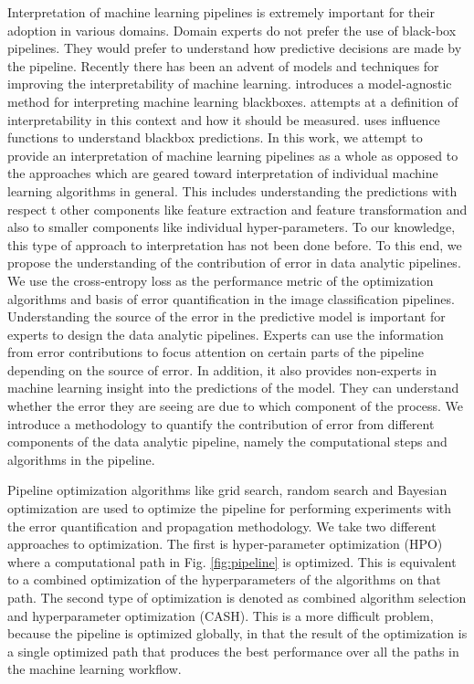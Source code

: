 Interpretation of machine learning pipelines is extremely important for their adoption in various domains. Domain experts do not prefer the use of black-box pipelines. They would prefer to understand how predictive decisions are made by the pipeline. Recently there has been an advent of models and techniques for improving the interpretability of machine learning. \cite{ribeiro2016model} introduces a model-agnostic method for interpreting machine learning blackboxes. \cite{doshi2017towards} attempts at a definition of interpretability in this context and how it should be measured. \cite{koh2017understanding} uses influence functions to understand blackbox predictions. In this work, we attempt to provide an interpretation of machine learning pipelines as a whole as opposed to the approaches which are geared toward interpretation of individual machine learning algorithms in general. This includes understanding the predictions with respect t other components like feature extraction and feature transformation and also to smaller components like individual hyper-parameters. To our knowledge, this type of approach to interpretation has not been done before.
To this end, we propose the understanding of the contribution of error in data analytic pipelines. We use the cross-entropy loss as the performance metric of the optimization algorithms and basis of error quantification in the image classification pipelines. Understanding the source of the error in the predictive model is important for experts to design the data analytic pipelines. Experts can use the information from error contributions to focus attention on certain parts of the pipeline depending on the source of error. In addition, it also provides non-experts in machine learning insight into the predictions of the model. They can understand whether the error they are seeing are due to which component of the process. We introduce a methodology to quantify the contribution of error from different components of the data analytic pipeline, namely the computational steps and algorithms in the pipeline. 

Pipeline optimization algorithms like grid search, random search \cite{bergstra2012random} and Bayesian optimization \cite{snoek2012practical} are used to optimize the pipeline for performing experiments with the error quantification and propagation methodology. We take two different approaches to optimization. The first is hyper-parameter optimization (HPO) where a computational path in Fig. \ref{fig:pipeline} is optimized. This is equivalent to a combined optimization of the hyperparameters of the algorithms on that path. The second type of optimization is denoted as combined algorithm selection and hyperparameter optimization (CASH). This is a more difficult problem, because the pipeline is optimized globally, in that the result of the optimization is a single optimized path that produces the best performance over all the paths in the machine learning workflow.  

